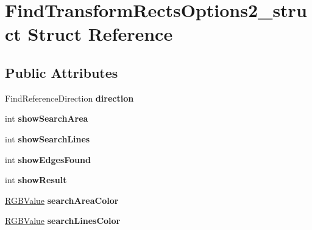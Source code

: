 \hypertarget{structFindTransformRectsOptions2__struct}{\section{\-Find\-Transform\-Rects\-Options2\-\_\-struct \-Struct \-Reference}
\label{structFindTransformRectsOptions2__struct}
}
\subsection*{\-Public \-Attributes}
\begin{DoxyCompactItemize}
\item 
\hypertarget{structFindTransformRectsOptions2__struct_a6b7528a7c3980b01c198de84c7189008}{\-Find\-Reference\-Direction {\bfseries direction}}\label{structFindTransformRectsOptions2__struct_a6b7528a7c3980b01c198de84c7189008}

\item 
\hypertarget{structFindTransformRectsOptions2__struct_ad936327929f35c7e86f2be5abedf6c7b}{int {\bfseries show\-Search\-Area}}\label{structFindTransformRectsOptions2__struct_ad936327929f35c7e86f2be5abedf6c7b}

\item 
\hypertarget{structFindTransformRectsOptions2__struct_a73306ce298215f0f5d606fe666f371ac}{int {\bfseries show\-Search\-Lines}}\label{structFindTransformRectsOptions2__struct_a73306ce298215f0f5d606fe666f371ac}

\item 
\hypertarget{structFindTransformRectsOptions2__struct_a8f0731151268e0ab5bebefea80d4ee11}{int {\bfseries show\-Edges\-Found}}\label{structFindTransformRectsOptions2__struct_a8f0731151268e0ab5bebefea80d4ee11}

\item 
\hypertarget{structFindTransformRectsOptions2__struct_abfec0e154350c4402d4a147cc105047c}{int {\bfseries show\-Result}}\label{structFindTransformRectsOptions2__struct_abfec0e154350c4402d4a147cc105047c}

\item 
\hypertarget{structFindTransformRectsOptions2__struct_a2fa49d85a37d4e3cfcfa65e3fabb8d04}{\hyperlink{structRGBValue__struct}{\-R\-G\-B\-Value} {\bfseries search\-Area\-Color}}\label{structFindTransformRectsOptions2__struct_a2fa49d85a37d4e3cfcfa65e3fabb8d04}

\item 
\hypertarget{structFindTransformRectsOptions2__struct_ac841a88a911fb315adb13a9279019a3a}{\hyperlink{structRGBValue__struct}{\-R\-G\-B\-Value} {\bfseries search\-Lines\-Color}}\label{structFindTransformRectsOptions2__struct_ac841a88a911fb315adb13a9279019a3a}


\end{DoxyCompactItemize}
